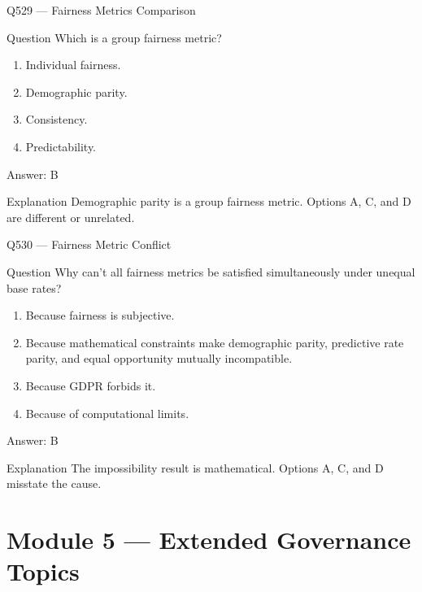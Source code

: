 \documentclass[aspectratio=169,8pt]{beamer}
\begin{document}
	\begin{frame}{Q529 --- Fairness Metrics Comparison}
		\begin{block}{Question}
			Which is a group fairness metric?
			\begin{enumerate}
				\item Individual fairness.
				\item Demographic parity.
				\item Consistency.
				\item Predictability.
			\end{enumerate}
		\end{block}
		\begin{exampleblock}{Answer: B}\end{exampleblock}
		\begin{block}{Explanation}
			Demographic parity is a group fairness metric. Options A, C, and D are different or unrelated.
		\end{block}
	\end{frame}
	
	\begin{frame}{Q530 --- Fairness Metric Conflict}
		\begin{block}{Question}
			Why can't all fairness metrics be satisfied simultaneously under unequal base rates?
			\begin{enumerate}
				\item Because fairness is subjective.
				\item Because mathematical constraints make demographic parity, predictive rate parity, and equal opportunity mutually incompatible.
				\item Because GDPR forbids it.
				\item Because of computational limits.
			\end{enumerate}
		\end{block}
		\begin{exampleblock}{Answer: B}\end{exampleblock}
		\begin{block}{Explanation}
			The impossibility result is mathematical. Options A, C, and D misstate the cause.
		\end{block}
	\end{frame}
	
	\section{Module 5 --- Extended Governance Topics}
	
\end{document}
